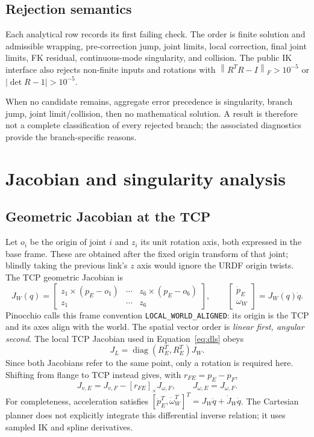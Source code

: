 \documentclass[11pt,a4paper]{report}
\newcommand{\file}[1]{\nolinkurl{#1}}
\newcommand{\diag}{\operatorname{diag}}
\newcommand{\norm}[1]{\left\lVert#1\right\rVert}
\newcommand{\skew}[1]{[#1]_{\times}}
\begin{document}
\subsection{Rejection semantics}
Each analytical row records its first failing check. The order is finite
solution and admissible wrapping, pre-correction jump, joint limits, local
correction, final joint limits, FK residual, continuous-mode singularity,
and collision. The public IK interface also rejects non-finite inputs and
rotations with $\norm{R^TR-I}_F>10^{-5}$ or $|\det R-1|>10^{-5}$.

When no candidate remains, aggregate error precedence is singularity, branch
jump, joint limit/collision, then no mathematical solution. A result is
therefore not a complete classification of every rejected branch; the
associated diagnostics provide the branch-specific reasons.

\section{Jacobian and singularity analysis}
\subsection{Geometric Jacobian at the TCP}
Let $o_i$ be the origin of joint $i$ and $z_i$ its unit rotation axis, both
expressed in the base frame. These are obtained after the fixed origin
transform of that joint; blindly taking the previous link's $z$ axis would
ignore the URDF origin twists. The TCP geometric Jacobian is
\begin{equation}
 J_W(q)=\begin{bmatrix}
 z_1\times(p_E-o_1)&\cdots&z_6\times(p_E-o_6)\\
 z_1&\cdots&z_6
 \end{bmatrix},\qquad
 \begin{bmatrix}\dot p_E\\\omega_W\end{bmatrix}=J_W(q)\dot q.
 \label{eq:jac}
\end{equation}
Pinocchio calls this frame convention \file{LOCAL_WORLD_ALIGNED}: its origin
is the TCP and its axes align with the world. The spatial vector order is
\emph{linear first, angular second}. The local TCP Jacobian used in
Equation~\eqref{eq:dls} obeys
\begin{equation}
 J_L=\diag(R_E^T,R_E^T)J_W.
\end{equation}
Since both Jacobians refer to the same point, only a rotation is required
here. Shifting from flange to TCP instead gives, with $r_{FE}=p_E-p_F$,
\begin{equation}
 J_{v,E}=J_{v,F}-\skew{r_{FE}}J_{\omega,F},\qquad
 J_{\omega,E}=J_{\omega,F}.
\end{equation}
For completeness, acceleration satisfies
$[\ddot p_E^T,\dot\omega_W^T]^T=J_W\ddot q+\dot J_W\dot q$.
The Cartesian planner does not explicitly integrate this differential
inverse relation; it uses sampled IK and spline derivatives.
\end{document}
